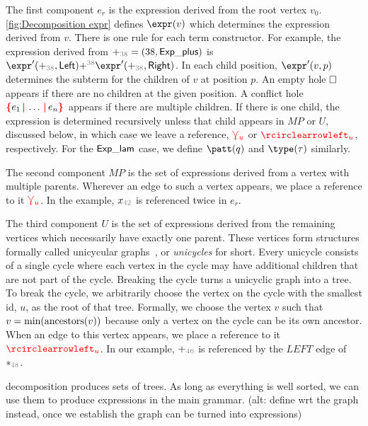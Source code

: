 The first component $e_r$ is the expression derived from the root vertex $v_0$.
\autoref{fig:Decomposition expr} defines $\expr(v)$ which determines the expression derived from $v$.
There is one rule for each term constructor.
For example, the expression derived from ${+}_{\id{38}} = (38, \ExpPlus)$ is $\expr'({+}_{\id{38}}, \PlusLeft) \text{+}^{\id{38}} \expr'({+}_{\id{38}}, \PlusRight)$.
In each child position, $\expr'(v, p)$ determines the subterm for the children of $v$ at position $p$.
An empty hole $\square$ appears if there are no children at the given position.
A conflict hole $\conflictHole{e_1,\ldots,e_n}$ appears if there are multiple children.
If there is one child, the expression is determined recursively unless that child appears in $MP$ or $U$, discussed below, in which case we leave a reference, $\textcolor{red}{\curlyveedownarrow_{u}}$ or $\cycleVertex{u}$, respectively.
For the $\mathsf{Exp\_lam}$ case, we define $\patt(q)$ and $\type(\tau)$ similarly.

The second component $MP$ is the set of expressions derived from a vertex with multiple parents.
Wherever an edge to such a vertex appears, we place a reference to it $\textcolor{red}{\curlyveedownarrow_{u}}$.
In the example, $x_{\id{42}}$ is referenced twice in $e_r$.

The third component $U$ is the set of expressions derived from the remaining vertices which necessarily have exactly one parent.
These vertices form structures formally called unicycular graphs~\citep{DBLP:journals/algorithmica/KruskalRS90}, or \emph{unicycles} for short.
Every unicycle consists of a single cycle where each vertex in the cycle may have additional children that are not part of the cycle.
Breaking the cycle turns a unicyclic graph into a tree.
To break the cycle, we arbitrarily choose the vertex on the cycle with the smallest id, $u$, as the root of that tree.
Formally, we choose the vertex $v$ such that $v = \operatorname{\text{min}}\mathopen{}\left(\operatorname{\text{ancestors}}\mathopen{}\left(v\right)\mathclose{}\right)\mathclose{}$ because
only a vertex on the cycle can be its own ancestor.
When an edge to this vertex appears, we place a reference to it $\cycleVertex{u}$.
In our example, ${+}_{\id{46}}$ is referenced by the $LEFT$ edge of ${*}_{\id{48}}$.


decomposition produces sets of trees. As long as everything is well sorted, we
can use them to produce expressions in the main grammar. (alt: define wrt the
graph instead, once we establish the graph can be turned into expressions)

